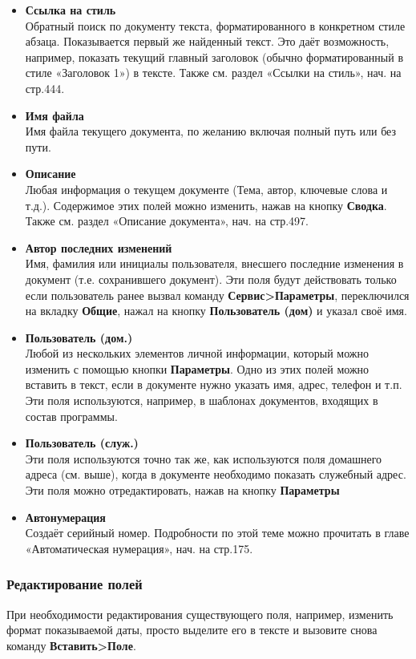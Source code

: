 \documentclass[a4paper,10pt]{article}
\begin{document}
\begin{itemize}
 \item \textbf{Ссылка на стиль}\\
 Обратный поиск по документу текста, форматированного в конкретном стиле абзаца. Показывается первый же найденный текст. Это даёт возможность, например, показать текущий главный заголовок (обычно форматированный в стиле «Заголовок 1») в тексте. Также см. раздел «Ссылки на стиль», нач. на стр.444.
 \item \textbf{Имя файла}\\
 Имя файла текущего документа, по желанию включая полный путь или без пути.
 \item \textbf{Описание}\\
 Любая информация о текущем документе (Тема, автор, ключевые слова и т.д.). Содержимое этих полей можно изменить, нажав на кнопку \textbf{Сводка}. Также см. раздел «Описание документа», нач. на стр.497.
 \item \textbf{Автор последних изменений}\\
 Имя, фамилия или инициалы пользователя, внесшего последние изменения в документ (т.е. сохранившего документ). Эти поля будут действовать только если пользователь ранее вызвал команду \textbf{Сервис>Параметры}, переключился на вкладку \textbf{Общие}, нажал на кнопку \textbf{Пользователь (дом)} и указал своё имя.
 \item \textbf{Пользователь (дом.)}\\
 Любой из нескольких элементов личной информации, который можно изменить с помощью кнопки \textbf{Параметры}. Одно из этих полей можно вставить в текст, если в документе нужно указать имя, адрес, телефон и т.п. Эти поля используются, например, в шаблонах документов, входящих в состав программы.
 \item \textbf{Пользователь (служ.)}\\
 Эти поля используются точно так же, как используются поля домашнего адреса (см. выше), когда в документе необходимо показать служебный адрес. Эти поля можно отредактировать, нажав на кнопку \textbf{Параметры}
 \item \textbf{Автонумерация}\\
 Создаёт серийный номер. Подробности по этой теме можно прочитать в главе «Автоматическая нумерация», нач. на стр.175.
\end{itemize}

\subsubsection{Редактирование полей}
При необходимости редактирования существующего поля, например, изменить формат показываемой даты, просто выделите его в тексте и вызовите снова команду \textbf{Вставить>Поле}.
\end{document}
